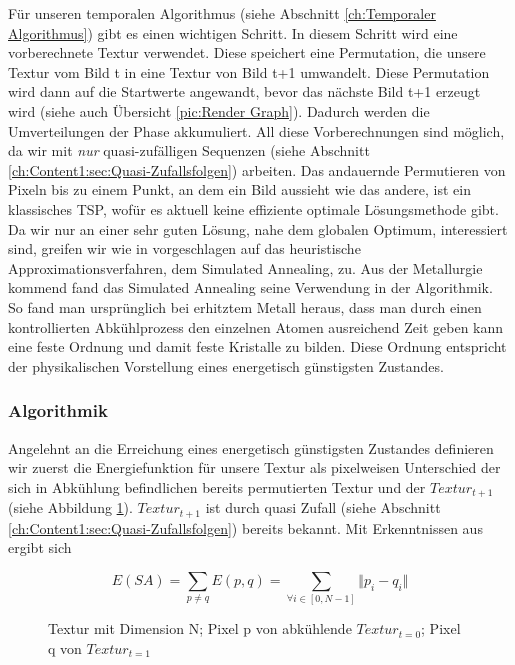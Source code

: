 Für unseren temporalen Algorithmus (siehe Abschnitt \ref{ch:Temporaler Algorithmus}) gibt es einen wichtigen  Schritt.
In diesem Schritt wird eine vorberechnete Textur verwendet. Diese speichert eine Permutation, die unsere  Textur vom Bild t in eine
 Textur von Bild t+1 umwandelt. Diese Permutation wird dann auf die Startwerte angewandt, bevor das nächste Bild t+1 erzeugt wird 
(siehe auch Übersicht \ref{pic:Render Graph}). Dadurch werden die  Umverteilungen der  Phase akkumuliert. 
All diese Vorberechnungen sind möglich, da wir mit \textit{\glqq nur\grqq} quasi-zufälligen Sequenzen (siehe Abschnitt \ref{ch:Content1:sec:Quasi-Zufallsfolgen}) arbeiten.
Das andauernde Permutieren von Pixeln bis zu einem Punkt, an dem ein Bild aussieht wie das andere, ist ein klassisches TSP, wofür es aktuell keine effiziente optimale Lösungsmethode gibt.
Da wir nur an einer sehr guten Lösung, nahe dem globalen Optimum, interessiert sind, greifen wir wie in \cite{hal02158423} vorgeschlagen auf das heuristische Approximationsverfahren,
dem Simulated Annealing, zu.
Aus der Metallurgie kommend fand das Simulated Annealing seine Verwendung in der Algorithmik. So fand man ursprünglich bei erhitztem Metall heraus, dass man durch einen 
kontrollierten Abkühlprozess den einzelnen Atomen ausreichend Zeit geben kann eine feste Ordnung und damit feste Kristalle zu bilden. Diese Ordnung entspricht der 
physikalischen Vorstellung eines energetisch günstigsten Zustandes.

\subsubsection{Algorithmik}

Angelehnt an die Erreichung eines energetisch günstigsten Zustandes definieren wir zuerst die Energiefunktion für unsere Textur als pixelweisen Unterschied
der sich in Abkühlung 
befindlichen bereits permutierten Textur und der $Textur_{t+1}$ (siehe Abbildung \ref{eq:pixel energy function}). $Textur_{t+1}$ ist durch quasi Zufall (siehe Abschnitt
\ref{ch:Content1:sec:Quasi-Zufallsfolgen}) bereits bekannt. Mit Erkenntnissen aus\cite{georgiev2016blue} ergibt sich

\begin{figure}[H]
    \begin{tcolorbox}[rightrule=3mm, rounded corners=east]
    \[ E(SA) = \sum_{p \neq q}E(p,q) = \sum_{\forall i \in [0,N-1]} \Vert{p_{i}-q_{i}}\Vert \]
    \end{tcolorbox}
    \caption{ Textur mit Dimension N; Pixel p von abkühlende 
    $Textur_{t=0}$; Pixel q von $Textur_{t=1}$}
    \label{eq:pixel energy function}
\end{figure}

